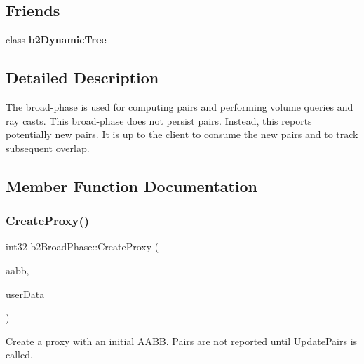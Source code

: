\subsection*{Friends}
\begin{DoxyCompactItemize}
\item 
\mbox{\label{classb2BroadPhase_ab98c00f14bde2796d3ccec29cf365701}} 
class {\bfseries b2\+Dynamic\+Tree}
\end{DoxyCompactItemize}


\subsection{Detailed Description}
The broad-\/phase is used for computing pairs and performing volume queries and ray casts. This broad-\/phase does not persist pairs. Instead, this reports potentially new pairs. It is up to the client to consume the new pairs and to track subsequent overlap. 

\subsection{Member Function Documentation}
\mbox{\label{classb2BroadPhase_ae2f7af756bc55ece45221466c5af449c}} 
\subsubsection{\texorpdfstring{Create\+Proxy()}{CreateProxy()}\hspace{0.1cm}{\footnotesize\ttfamily [1/2]}}
{\footnotesize\ttfamily int32 b2\+Broad\+Phase\+::\+Create\+Proxy (\begin{DoxyParamCaption}\item[{const \hyperlink{structb2AABB}{b2\+A\+A\+BB} \&}]{aabb,  }\item[{void $\ast$}]{user\+Data }\end{DoxyParamCaption})}

Create a proxy with an initial \hyperlink{classAABB}{A\+A\+BB}. Pairs are not reported until Update\+Pairs is called. \mbox{\label{classb2BroadPhase_ae2f7af756bc55ece45221466c5af449c}} 
